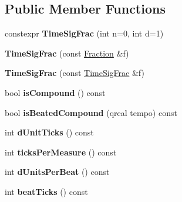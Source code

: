 \subsection*{Public Member Functions}
\begin{DoxyCompactItemize}
\item 
\mbox{\label{class_ms_1_1_time_sig_frac_abbfd3700ce414cdcd8618627ed2d4f49}} 
constexpr {\bfseries Time\+Sig\+Frac} (int n=0, int d=1)
\item 
\mbox{\label{class_ms_1_1_time_sig_frac_ad27c3901dd4b9404f63057adddaca077}} 
{\bfseries Time\+Sig\+Frac} (const \hyperlink{class_ms_1_1_fraction}{Fraction} \&f)
\item 
\mbox{\label{class_ms_1_1_time_sig_frac_a8ff8db7bab791459082e86e8e902156c}} 
{\bfseries Time\+Sig\+Frac} (const \hyperlink{class_ms_1_1_time_sig_frac}{Time\+Sig\+Frac} \&f)
\item 
\mbox{\label{class_ms_1_1_time_sig_frac_ad1311d10e81223bb2664532f1261e1ec}} 
bool {\bfseries is\+Compound} () const
\item 
\mbox{\label{class_ms_1_1_time_sig_frac_afb4c5b24067e7ecd6721aafd951cdbc1}} 
bool {\bfseries is\+Beated\+Compound} (qreal tempo) const
\item 
\mbox{\label{class_ms_1_1_time_sig_frac_a4c4fb5cda85cf80fc435016d7ff42f12}} 
int {\bfseries d\+Unit\+Ticks} () const
\item 
\mbox{\label{class_ms_1_1_time_sig_frac_ab49caa19b013934f446a6363d5760bad}} 
int {\bfseries ticks\+Per\+Measure} () const
\item 
\mbox{\label{class_ms_1_1_time_sig_frac_ad671436198e18646c567ae62a37ce8c1}} 
int {\bfseries d\+Units\+Per\+Beat} () const
\item 
\mbox{\label{class_ms_1_1_time_sig_frac_afcd07f0e38b7ba4699c17041c7813387}} 
int {\bfseries beat\+Ticks} () const
\item 
\mbox{\label{class_ms_1_1_time_sig_frac_a575ef69aaa24ec9531c34d9e416674a5}} 

\end{DoxyCompactItemize}
